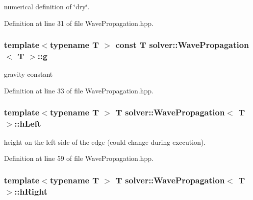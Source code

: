 numerical definition of \char`\"{}dry\char`\"{}. 



Definition at line 31 of file Wave\+Propagation.\+hpp.

\subsubsection[{\texorpdfstring{g}{g}}]{\setlength{\rightskip}{0pt plus 5cm}template$<$typename T $>$ const T {\bf solver\+::\+Wave\+Propagation}$<$ T $>$\+::g\hspace{0.3cm}{\ttfamily [protected]}}\hypertarget{classsolver_1_1WavePropagation_a5364825d416254d67103f1969ad2e273}{}\label{classsolver_1_1WavePropagation_a5364825d416254d67103f1969ad2e273}


gravity constant 



Definition at line 33 of file Wave\+Propagation.\+hpp.

\subsubsection[{\texorpdfstring{h\+Left}{hLeft}}]{\setlength{\rightskip}{0pt plus 5cm}template$<$typename T $>$ T {\bf solver\+::\+Wave\+Propagation}$<$ T $>$\+::h\+Left\hspace{0.3cm}{\ttfamily [protected]}}\hypertarget{classsolver_1_1WavePropagation_ae44e91bee496fad2170039ccdbb98743}{}\label{classsolver_1_1WavePropagation_ae44e91bee496fad2170039ccdbb98743}


height on the left side of the edge (could change during execution). 



Definition at line 59 of file Wave\+Propagation.\+hpp.

\subsubsection[{\texorpdfstring{h\+Right}{hRight}}]{\setlength{\rightskip}{0pt plus 5cm}template$<$typename T $>$ T {\bf solver\+::\+Wave\+Propagation}$<$ T $>$\+::h\+Right\hspace{0.3cm}{\ttfamily [protected]}}\hypertarget{classsolver_1_1WavePropagation_a6269e7a67be3c63ceaca5a4030f921ec}{}\label{classsolver_1_1WavePropagation_a6269e7a67be3c63ceaca5a4030f921ec}


